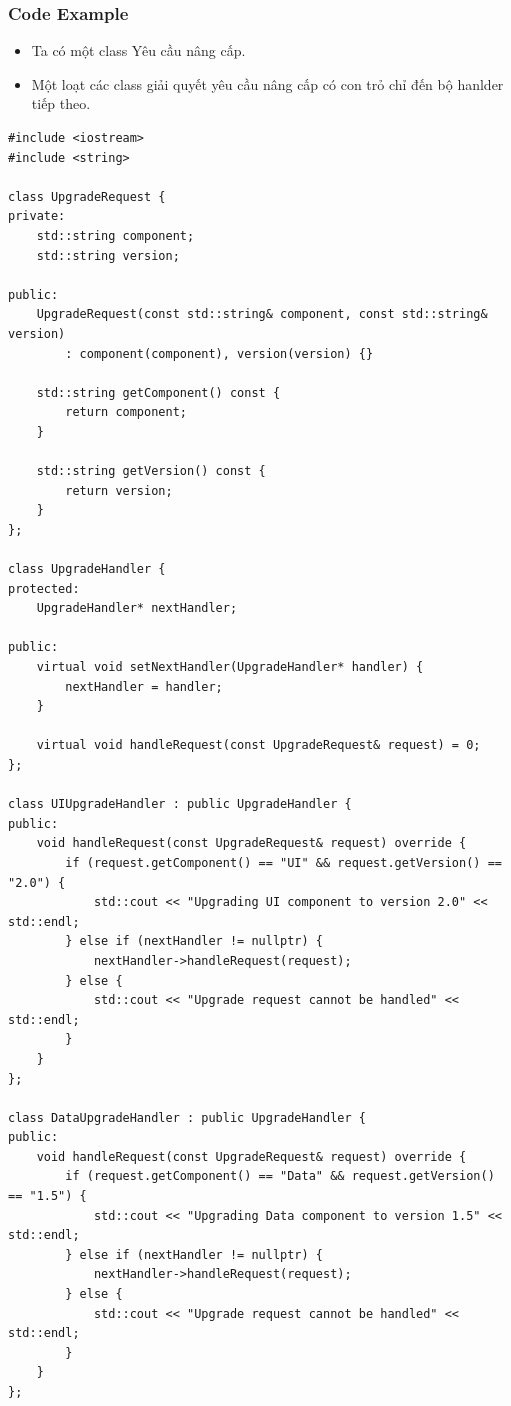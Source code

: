 \subsubsection{Code Example}
\begin{itemize}
    \item Ta có một class Yêu cầu nâng cấp.
    \item Một loạt các class giải quyết yêu cầu nâng cấp có con trỏ chỉ đến bộ hanlder tiếp theo.
\end{itemize}
\begin{lstlisting}
#include <iostream>
#include <string>

class UpgradeRequest {
private:
    std::string component;
    std::string version;

public:
    UpgradeRequest(const std::string& component, const std::string& version)
        : component(component), version(version) {}

    std::string getComponent() const {
        return component;
    }

    std::string getVersion() const {
        return version;
    }
};

class UpgradeHandler {
protected:
    UpgradeHandler* nextHandler;

public:
    virtual void setNextHandler(UpgradeHandler* handler) {
        nextHandler = handler;
    }

    virtual void handleRequest(const UpgradeRequest& request) = 0;
};

class UIUpgradeHandler : public UpgradeHandler {
public:
    void handleRequest(const UpgradeRequest& request) override {
        if (request.getComponent() == "UI" && request.getVersion() == "2.0") {
            std::cout << "Upgrading UI component to version 2.0" << std::endl;
        } else if (nextHandler != nullptr) {
            nextHandler->handleRequest(request);
        } else {
            std::cout << "Upgrade request cannot be handled" << std::endl;
        }
    }
};

class DataUpgradeHandler : public UpgradeHandler {
public:
    void handleRequest(const UpgradeRequest& request) override {
        if (request.getComponent() == "Data" && request.getVersion() == "1.5") {
            std::cout << "Upgrading Data component to version 1.5" << std::endl;
        } else if (nextHandler != nullptr) {
            nextHandler->handleRequest(request);
        } else {
            std::cout << "Upgrade request cannot be handled" << std::endl;
        }
    }
};


\end{lstlisting}
